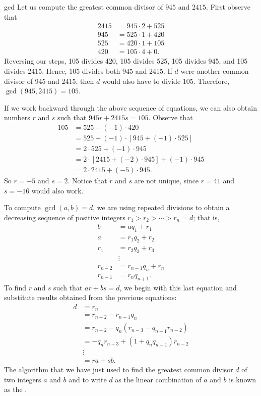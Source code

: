 \begin{example}{gcd}
Let us compute the greatest common divisor of $945$ and $2415$.  First observe that 
\begin{align*}
2415 & = 945 \cdot 2 + 525 \\
945 & = 525 \cdot 1 + 420 \\
525 & = 420 \cdot 1 + 105 \\
420 & = 105 \cdot 4 + 0.
\end{align*}
Reversing our steps, 105 divides 420, 105 divides 525, 105 divides 945, and 105 divides 2415.  Hence, 105 divides both 945 and 2415.  If $d$ were another common divisor of 945 and 2415, then $d$ would also have to divide 105.  Therefore, $\gcd( 945, 2415 ) = 105$.

If we work backward through the above sequence of equations, we can also obtain numbers $r$ and $s$ such that $945 r + 2415 s = 105$.  Observe that 
\begin{align*}
105 & = 525 + (-1) \cdot 420 \\
& = 525 + (-1) \cdot [945 + (-1) \cdot 525] \\
& = 2 \cdot 525 + (-1) \cdot 945 \\
& = 2 \cdot [2415 + (-2) \cdot 945] + (-1) \cdot 945 \\
& = 2 \cdot 2415 + (-5) \cdot 945.
\end{align*}
So $r = -5$ and $s= 2$.  Notice that $r$ and $s$ are not unique, since $r = 41$ and $s = -16$ would also work.
\end{example}

To compute $\gcd(a,b) = d$, we are using repeated divisions to obtain a decreasing sequence of positive integers $r_1 > r_2 > \cdots > r_n = d$; that is,
\begin{align*}
b & = a q_1 + r_1 \\
a & = r_1 q_2 + r_2 \\
r_1 & = r_2 q_3 + r_3 \\
& \vdots  \\
r_{n - 2} & = r_{n - 1} q_{n} + r_{n} \\
r_{n - 1} & = r_n q_{n + 1}.
\end{align*}
To find $r$ and $s$ such that $ar + bs = d$, we begin with this last equation and substitute results obtained from the previous equations:
\begin{align*}
d & = r_n \\
& = r_{n - 2} - r_{n - 1} q_n \\
& = r_{n - 2} - q_n( r_{n - 3} - q_{n - 1} r_{n - 2} ) \\
& = -q_n r_{n - 3} + ( 1+ q_n q_{n-1} ) r_{n - 2}  \\
& \vdots  \\
& = ra + sb.
\end{align*}
The algorithm that we have just used to find the greatest common divisor $d$ of two integers $a$ and $b$ and to write $d$ as the linear combination of $a$ and $b$ is known as the .  
 
